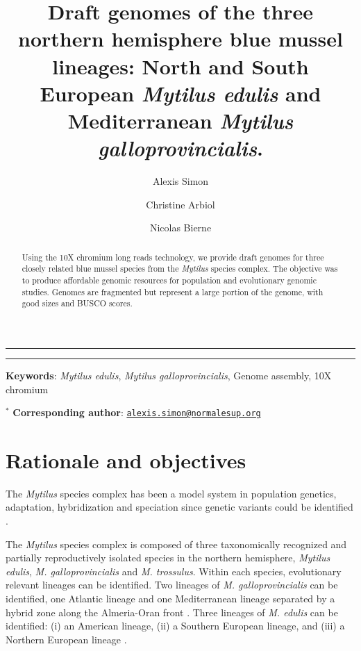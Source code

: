 \documentclass[11pt, a4paper]{article}
\title{Draft genomes of the three northern hemisphere blue mussel lineages: North and South European \emph{Mytilus edulis} and Mediterranean \emph{Mytilus galloprovincialis}.}
\author[1,*]{Alexis Simon}
\author[1]{Christine Arbiol}
\author[1]{Nicolas Bierne}
\affil[1]{CNRS, Univ Montpellier, \ldots{}}
\begin{document}
\maketitle


\vspace{1cm}
\hrule
\begin{abstract}
	Using the 10X chromium long reads technology, we provide draft genomes for three closely related blue mussel species from the \emph{Mytilus} species complex.
	The objective was to produce affordable genomic resources for population and evolutionary genomic studies.
	Genomes are fragmented but represent a large portion of the genome, with good sizes and BUSCO scores.
\end{abstract}

\vspace{3mm}
\hrule
\vspace{5mm}

\noindent
\textbf{Keywords}: \emph{Mytilus edulis}, \emph{Mytilus galloprovincialis}, Genome assembly, 10X chromium

\noindent
$^{*}$ \textbf{Corresponding author}: \href{mailto:alexis.simon@normalesup.org}{\nolinkurl{alexis.simon@normalesup.org}}

\newpage

\section{Rationale and objectives}\label{introduction}

The \textit{Mytilus} species complex has been a model system in population genetics, adaptation, hybridization and speciation since genetic variants could be identified \parencite{Milkman1970, Koehn1972, Ahmad1977, Skibinski1978, Quesada1995b, Bierne2003, Fraisse2016a, Simon2021}.

The \textit{Mytilus} species complex is composed of three taxonomically recognized and partially reproductively isolated species in the northern hemisphere,
\textit{Mytilus edulis}, \textit{M. galloprovincialis} and \textit{M. trossulus}.
Within each species, evolutionary relevant lineages can be identified.
Two lineages of \textit{M. galloprovincialis} can be identified, one Atlantic lineage and one Mediterranean lineage separated by a hybrid zone along the Almeria-Oran front \parencite{Quesada1995, Fraisse2016a, ElAyari2019}.
Three lineages of \textit{M. edulis} can be identified: (i) an American lineage, (ii) a Southern European lineage, and (iii) a Northern European lineage \parencite{Fraisse2016a, Simon2020}.
\end{document}
